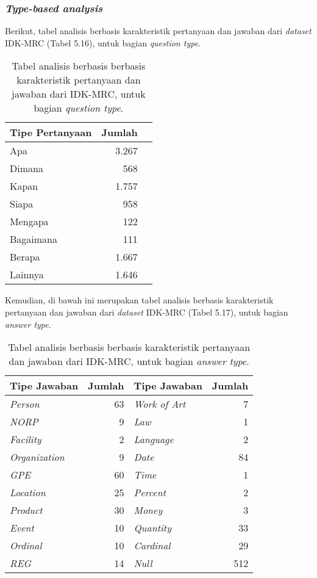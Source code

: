 \subsubsection{\emph{Type-based analysis}}
Berikut, tabel analisis berbasis karakteristik pertanyaan dan jawaban dari \emph{dataset} IDK-MRC (Tabel 5.16), untuk bagian \emph{question type}.

\begin{table}[H]\centering
\begin{tabular}{lrr}\toprule
Tipe Pertanyaan &Jumlah \\\midrule
Apa &3.267 \\
Dimana &568 \\
Kapan &1.757 \\
Siapa &958 \\
Mengapa &122 \\
Bagaimana &111 \\
Berapa &1.667 \\
Lainnya &1.646 \\
\bottomrule
\end{tabular}
\caption{Tabel analisis berbasis berbasis karakteristik pertanyaan dan jawaban dari IDK-MRC, untuk bagian \emph{question type}.}
\end{table}

Kemudian, di bawah ini merupakan tabel analisis berbasis karakteristik pertanyaan dan jawaban dari \emph{dataset} IDK-MRC (Tabel 5.17), untuk bagian \emph{answer type}.

\begin{table}[H]\centering
\begin{tabular}{lr|lr}
\toprule
Tipe Jawaban & Jumlah & Tipe Jawaban & Jumlah \\
\midrule
\emph{Person} & 63 & \emph{Work of Art} & 7 \\
\emph{NORP} & 9 & \emph{Law} & 1 \\
\emph{Facility} & 2 & \emph{Language} & 2 \\
\emph{Organization} & 9 & \emph{Date} & 84 \\
\emph{GPE} & 60 & \emph{Time} & 1 \\
\emph{Location} & 25 & \emph{Percent} & 2 \\
\emph{Product} & 30 & \emph{Money} & 3 \\
\emph{Event} & 10 & \emph{Quantity} & 33 \\
\emph{Ordinal} & 10 & \emph{Cardinal} & 29 \\
\emph{REG} & 14 & \emph{Null} & 512 \\
\bottomrule
\end{tabular}
\caption{Tabel analisis berbasis berbasis karakteristik pertanyaan dan jawaban dari IDK-MRC, untuk bagian \emph{answer type}.}
\end{table}

